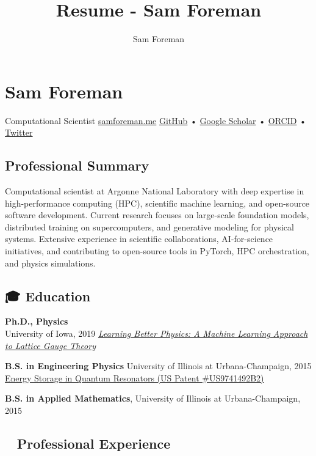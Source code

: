 \documentclass[
  letterpaper,
  DIV=11,
  numbers=noendperiod]{scrartcl}
\title{Resume - Sam Foreman}
\author{Sam Foreman}
\date{}
\begin{document}
\maketitle


\section{Sam Foreman}\label{sam-foreman}

Computational Scientist \href{https://samforeman.me}{samforeman.me}
\href{https://github.com/saforem2}{GitHub} •
\href{https://scholar.google.com/citations?user=vV_1zDwAAAAJ&hl=en}{Google
Scholar} • \href{https://orcid.org/0000-0002-9981-0876}{ORCID} •
\href{https://twitter.com/saforem2}{Twitter}

\subsection{Professional Summary}\label{professional-summary}

Computational scientist at Argonne National Laboratory with deep
expertise in high-performance computing (HPC), scientific machine
learning, and open-source software development. Current research focuses
on large-scale foundation models, distributed training on
supercomputers, and generative modeling for physical systems. Extensive
experience in scientific collaborations, AI-for-science initiatives, and
contributing to open-source tools in PyTorch, HPC orchestration, and
physics simulations.

\subsection{🎓 Education}\label{education}

\textbf{Ph.D., Physics}\\
University of Iowa, 2019
\href{https://ir.uiowa.edu/etd/6805/}{\emph{Learning Better Physics: A
Machine Learning Approach to Lattice Gauge Theory}}

\textbf{B.S. in Engineering Physics} University of Illinois at
Urbana-Champaign, 2015
\href{https://patents.google.com/patent/US9741492B2/en}{Energy Storage
in Quantum Resonators (US Patent \#US9741492B2)}

\textbf{B.S. in Applied Mathematics}, University of Illinois at
Urbana-Champaign, 2015

\subsection{🧑‍🔬 Professional Experience}\label{professional-experience}
\end{document}
